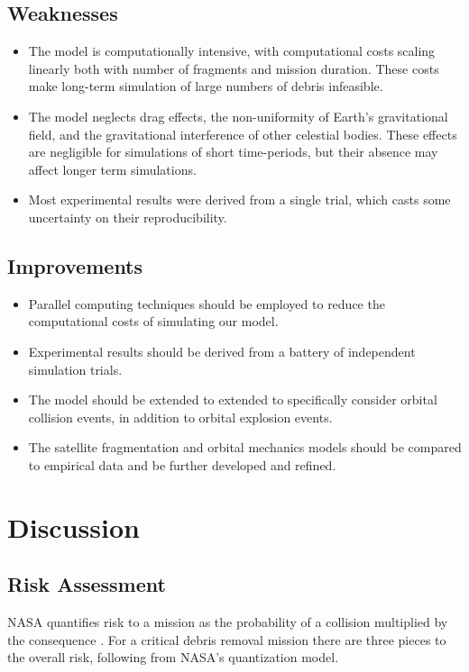 \documentclass[12pt]{scrartcl}
\begin{document}
\subsection{Weaknesses}
    \begin{itemize}
        \item The model is computationally intensive, with computational costs scaling linearly both with number of fragments and mission duration. These costs make long-term simulation of large numbers of debris infeasible.
        \item The model neglects drag effects, the non-uniformity of Earth's gravitational field, and the gravitational interference of other celestial bodies. These effects are negligible for simulations of short time-periods, but their absence may affect longer term simulations.
        \item Most experimental results were derived from a single trial, which casts some uncertainty on their reproducibility.
    \end{itemize}
\subsection{Improvements}
    \begin{itemize}
        \item Parallel computing techniques should be employed to reduce the computational costs of simulating our model.
        \item Experimental results should be derived from a battery of independent simulation trials.
        \item The model should be extended to extended to specifically consider orbital collision events, in addition to orbital explosion events.
        \item The satellite fragmentation and orbital mechanics models should be compared to empirical data and be further developed and refined.
    \end{itemize}
\section{Discussion} \label{sec:discussion}
\subsection{Risk Assessment} \label{subsec:risk_assessment}
NASA quantifies risk to a mission as the probability of a collision multiplied by the consequence \cite{risk}. For a critical debris removal mission there are three pieces to the overall risk, following from NASA's quantization model.
\end{document}
